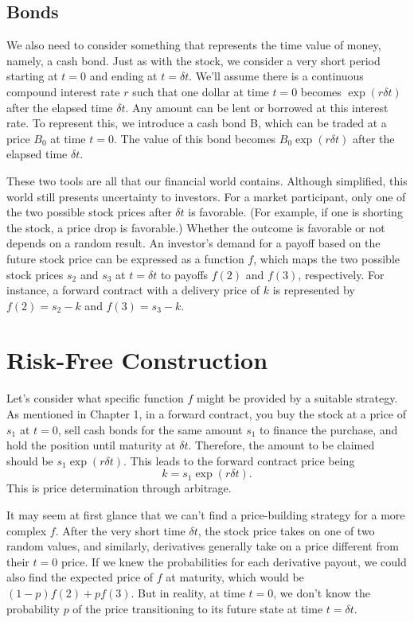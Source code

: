 \documentclass[uplatex,a4j,12pt,dvipdfmx]{jsarticle}
\begin{document}
\subsection{Bonds}
We also need to consider something that represents the time value of money, namely, a cash bond. Just as with the stock, we consider a very short period starting at $t=0$ and ending at $t=\delta t$. We'll assume there is a continuous compound interest rate $r$ such that one dollar at time $t=0$ becomes $\exp(r\delta t)$ after the elapsed time $\delta t$. Any amount can be lent or borrowed at this interest rate. To represent this, we introduce a cash bond B, which can be traded at a price $B_0$ at time $t=0$. The value of this bond becomes $B_0 \exp(r\delta t)$ after the elapsed time $\delta t$.

These two tools are all that our financial world contains. Although simplified, this world still presents uncertainty to investors. For a market participant, only one of the two possible stock prices after $\delta t$ is favorable. (For example, if one is shorting the stock, a price drop is favorable.) Whether the outcome is favorable or not depends on a random result. An investor's demand for a payoff based on the future stock price can be expressed as a function $f$, which maps the two possible stock prices $s_2$ and $s_3$ at $t=\delta t$ to payoffs $f(2)$ and $f(3)$, respectively. For instance, a forward contract with a delivery price of $k$ is represented by $f(2)=s_2 -k$ and $f(3)=s_3 -k$.

\section{Risk-Free Construction}
Let's consider what specific function $f$ might be provided by a suitable strategy. As mentioned in Chapter 1, in a forward contract, you buy the stock at a price of $s_1$ at $t=0$, sell cash bonds for the same amount $s_1$ to finance the purchase, and hold the position until maturity at $\delta t$. Therefore, the amount to be claimed should be $s_1 \exp(r\delta t)$. This leads to the forward contract price being \[k = s_1 \exp(r\delta t).\] This is price determination through arbitrage.

It may seem at first glance that we can't find a price-building strategy for a more complex $f$. After the very short time $\delta t$, the stock price takes on one of two random values, and similarly, derivatives generally take on a price different from their $t=0$ price. If we knew the probabilities for each derivative payout, we could also find the expected price of $f$ at maturity, which would be $(1-p)f(2) + pf(3)$. But in reality, at time $t=0$, we don't know the probability $p$ of the price transitioning to its future state at time $t=\delta t$.
\end{document}
